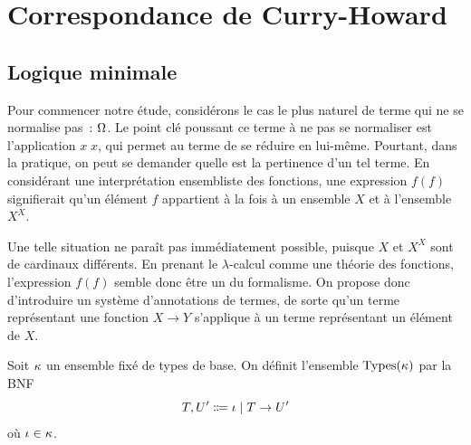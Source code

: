 \section{Correspondance de Curry-Howard}

\subsection{Logique minimale}

Pour commencer notre étude, considérons le cas le plus naturel de terme qui ne
se normalise pas~: $\Omega$. Le point clé poussant ce terme à ne pas se
normaliser est l'application $x\;x$, qui permet au terme de se réduire en
lui-même. Pourtant, dans la pratique, on peut se demander quelle est la
pertinence d'un tel terme. En considérant une interprétation ensembliste des
fonctions, une expression $f(f)$ signifierait qu'un élément $f$ appartient à la
fois à un ensemble $X$ et à l'ensemble $X^X$.

Une telle situation ne paraît pas immédiatement possible, puisque $X$ et $X^X$
sont de cardinaux différents. En prenant le $\lambda$-calcul comme une théorie
des fonctions, l'expression $f(f)$ semble donc être un  du
formalisme. On propose donc d'introduire un système d'annotations de termes, de
sorte qu'un terme représentant une fonction $X \to Y$ s'applique à un terme
représentant un élément de $X$.

\begin{definition}
  Soit $\TyB$ un ensemble fixé de types de base.
  On définit l'ensemble $\tyT(\TyB)$ par la BNF
  \[\varTypA,\varTypB' \inddefeq \varTypBa \mid \varTypA \to \varTypB'\]
  où $\iota \in \kappa$.
  \index[notation]{$\TyB$}
  \index[notation]{$\tyT(\TyB)$}
\end{definition}

